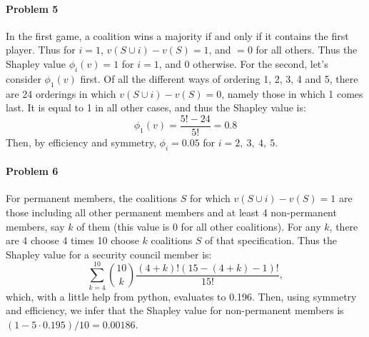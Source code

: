 \documentclass[12pt]{article}
\begin{document}
\paragraph{Problem 5}
In the first game, a coalition wins a majority if and only if it contains the
first player. Thus for $i=1$, $v(S\cup i)- v(S) = 1$, and $= 0$ for all others.
Thus the Shapley value $\phi_i(v) = 1$ for $i=1$, and $0$ otherwise.
For the second, let's consider $\phi_1(v)$ first. Of all the different ways of
ordering 1, 2, 3, 4 and 5, there are 24 orderings in which $v(S\cup i) - v(S) =
0$, namely those in which 1 comes last. It is equal to 1 in all other cases,
and thus the Shapley value is:
\begin{displaymath}
  \phi_1(v) = \frac{5!-24}{5!} = 0.8
\end{displaymath}
Then, by efficiency and symmetry, $\phi_i = 0.05$ for $i = 2,\ 3,\ 4,\ 5$.

\paragraph{Problem 6}
For permanent members, the coalitions $S$ for which $v(S\cup i) - v(S) = 1$
are those including all other permanent members and at least 4 non-permanent
members, say $k$ of them (this value is 0 for all other coalitions).
For any $k$, there are 4 choose 4 times 10 choose $k$
coalitions $S$ of that specification. Thus the Shapley value for a security
council member is:
\begin{displaymath}
  \sum_{k=4}^{10}\binom{10}{k}\frac{(4+k)!(15-(4+k)-1)!}{15!},
\end{displaymath}
which, with a little help from python, evaluates to 0.196. Then, using symmetry
and efficiency, we infer that the Shapley value for non-permanent members is
$(1-5\cdot0.195)/10 = 0.00186$.
\end{document}
